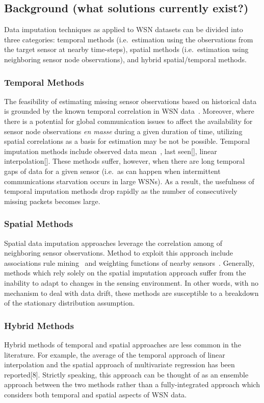 \documentclass[10pt]{sensys11}
\begin{document}
\subsection{Background (what solutions currently exist?)}
Data imputation techniques as applied to WSN datasets can be divided into three categories:
temporal methods (i.e.\ estimation using the observations from the target sensor at nearby time-steps),
spatial methods (i.e.\ estimation using neighboring sensor node observations),
and hybrid spatial/temporal methods.

\subsubsection{Temporal Methods}
The feasibility of estimating missing sensor observations based on historical data is grounded by the known temporal correlation in WSN data~\cite{akyildiz2004exploiting}.
Moreover, where there is a potential for global communication issues to affect the availability for sensor node observations \emph{en masse} during a given duration of time, utilizing spatial correlations as a basis for estimation may be not be possible.
Temporal imputation methods include observed data mean~\cite{madden2005tinydb,setz2009combining}, last seen[], linear interpolation[].
These methods suffer, however, when there are long temporal gaps of data for a given sensor (i.e.\ as can happen when intermittent communications starvation occurs in large WSNs).
As a result, the usefulness of temporal imputation methods drop rapidly as the number of consecutively missing packets becomes large.

\subsubsection{Spatial Methods}
Spatial data imputation approaches leverage the correlation among of neighboring sensor observations.
Method to exploit this approach include associations rule mining~\cite{le2005estimating,jiang2007estimating} and weighting functions of nearby sensors~\cite{li2008spatial,li2008data,pan2010k}.
Generally, methods which rely solely on the spatial imputation approach suffer from the inability to adapt to changes in the sensing environment.
In other words, with no mechanism to deal with data drift, these methods are susceptible to a breakdown of the stationary distribution assumption.

\subsubsection{Hybrid Methods}
Hybrid methods of temporal and spatial approaches are less common in the literature.
For example, the average of the temporal approach of linear interpolation and the spatial approach of multivariate regression has been reported[8].
Strictly speaking, this approach can be thought of as an ensemble approach between the two methods rather than a fully-integrated approach which considers both temporal and spatial aspects of WSN data.
\end{document}
